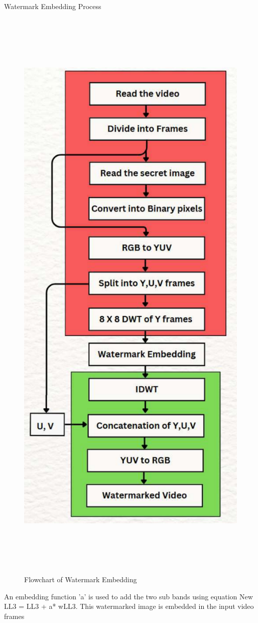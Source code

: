 \documentclass[final]{beamer}
\newlength{\colwidth}
\begin{document}
\begin{frame}[t]
\begin{columns}[t]
\begin{column}{\colwidth}
\begin{block}{Watermark Embedding Process}
\begin{figure}
    \centering
    \includegraphics[width=1.0\textwidth, height = 41cm]{images and logos/Embedding algo1.pdf}
    \caption{Flowchart of Watermark Embedding}
    \label{fig4:img3}
\end{figure}
 An embedding function 'a' is used to add the two sub bands using equation New LL3 = LL3 + a* wLL3. This watermarked image is embedded in the input 
video frames
\end{block}


\end{column}
\end{columns}
\end{frame}
\end{document}
